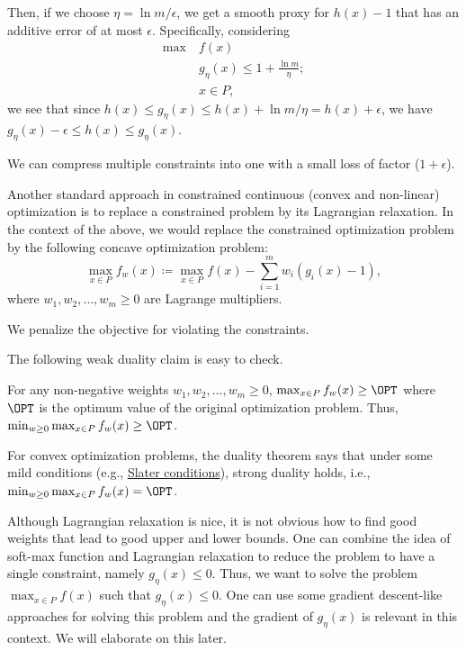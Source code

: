 Then, if we choose \(\eta = \ln m / \epsilon \), we get a smooth proxy for \(h(x) - 1\) that has an additive error of at most \(\epsilon \). Specifically, considering
\[
	\begin{aligned}
		\max~ & f(x)                                     \\
		      & g_\eta (x) \leq 1 + \frac{\ln m}{\eta }; \\
		      & x \in P,
	\end{aligned}
\]
we see that since \(h(x) \leq g_\eta (x) \leq h(x) + \ln m / \eta = h(x) + \epsilon \), we have \(g_\eta (x) - \epsilon \leq h(x) \leq g_\eta (x)\).

\begin{remark}
	We can compress multiple constraints into one with a small loss of factor (\(1 + \epsilon \)).
\end{remark}

Another standard approach in constrained continuous (convex and non-linear) optimization is to replace a constrained problem by its Lagrangian relaxation. In the context of the above, we would replace the constrained optimization problem by the following concave optimization problem:
\[
	\max_{x \in P} f_w(x) \coloneqq \max _{x \in P} f(x) - \sum_{i=1}^{m} w_i(g_i(x) - 1),
\]
where \(w_1, w_2, \dots , w_m \geq 0\) are Lagrange multipliers.

\begin{intuition}
	We penalize the objective for violating the constraints.
\end{intuition}

The following weak duality claim is easy to check.

\begin{claim}
	For any non-negative weights \(w_1, w_2, \dots , w_m \geq 0\), \(\max _{x \in P} f_w(x) \geq \OPT\) where \(\OPT\) is the optimum value of the original optimization problem. Thus, \(\min _{w\geq 0} \max _{x \in P} f_w(x) \geq \OPT\).
\end{claim}

For convex optimization problems, the duality theorem says that under some mild conditions (e.g., \href{https://en.wikipedia.org/wiki/Slater%27s_condition}{Slater conditions}), strong duality holds, i.e., \(\min _{w \geq 0} \max _{x \in P} f_w(x) = \OPT\).

Although Lagrangian relaxation is nice, it is not obvious how to find good weights that lead to good upper and lower bounds. One can combine the idea of soft-max function and Lagrangian relaxation to reduce the problem to have a single constraint, namely \(g_\eta (x) \leq 0\). Thus, we want to solve the problem \(\max _{x \in P} f(x)\) such that \(g_\eta (x) \leq 0\). One can use some gradient descent-like approaches for solving this problem and the gradient of \(g_\eta (x)\) is relevant in this context. We will elaborate on this later.

